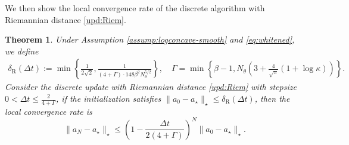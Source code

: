 \documentclass[11pt]{article}
\theoremstyle{plain}
\newtheorem{theorem}{Theorem}[section]
\theoremstyle{definition}
\theoremstyle{remark}
\begin{document}
We then show the local convergence rate of the discrete algorithm with Riemannian distance \eqref{upd:Riem}.

\begin{theorem}
    Under Assumption \ref{assump:logconcave-smooth} and \eqref{eq:whitened}, we define
    \begin{align*}
        \delta_\mathrm{R} (\Delta t) := \min \left\{ \frac{1}{2\sqrt{2}}, \frac{1}{(4 + \Gamma) \cdot 148 \beta^2 N_\theta^{5/2}} \right\}, \quad \Gamma = \min \left\{ \beta - 1, N_\theta \left( 3 + \frac{4}{\sqrt{\pi}} (1 + \log \kappa) \right) \right\}.
    \end{align*}
    Consider the discrete update with Riemannian distance \eqref{upd:Riem} with stepsize $0 < \Delta t \leq \frac{2}{4 + \Gamma}$, if the initialization satisfies $\|a_0 - a_\star\|_\star \leq \delta_\mathrm{R} (\Delta t)$, then the local convergence rate is
    \begin{equation*}
        \|a_N - a_\star\|_\star \leq \left( 1 - \frac{\Delta t}{2 (4 + \Gamma)} \right)^N \|a_0 - a_\star\|_\star.
    \end{equation*}
\end{theorem}
\end{document}
